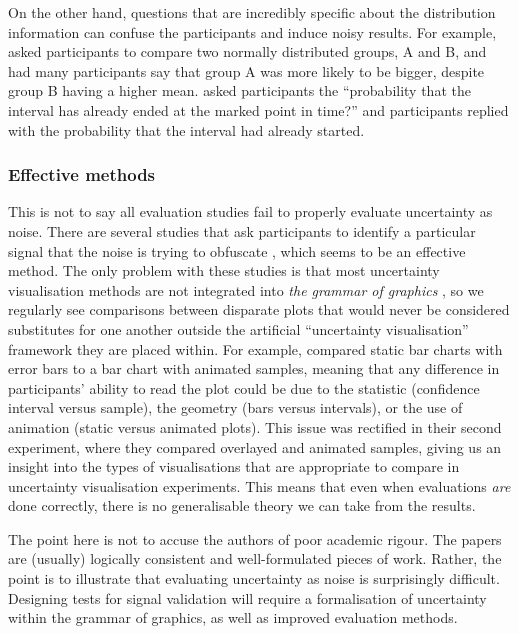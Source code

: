 \documentclass[]{ar-1col-S2O}
\begin{document}
On the other hand, questions that are incredibly specific about the
distribution information can confuse the participants and induce noisy
results. For example, \citet{Hullman2015} asked participants to compare
two normally distributed groups, A and B, and had many participants say
that group A was more likely to be bigger, despite group B having a
higher mean. \citet{Gschwandtnei2016} asked participants the
``probability that the interval has already ended at the marked point in
time?'' and participants replied with the probability that the interval
had already started.

\subsubsection{Effective methods}\label{effective-methods}

This is not to say all evaluation studies fail to properly evaluate
uncertainty as noise. There are several studies that ask participants to
identify a particular signal that the noise is trying to obfuscate
\citep{Kale2018, Correll2014}, which seems to be an effective method.
The only problem with these studies is that most uncertainty
visualisation methods are not integrated into \emph{the grammar of
graphics} \citep{Leland2005, ggplot2}, so we regularly see comparisons
between disparate plots that would never be considered substitutes for
one another outside the artificial ``uncertainty visualisation''
framework they are placed within. For example, \citet{Kale2018} compared
static bar charts with error bars to a bar chart with animated samples,
meaning that any difference in participants' ability to read the plot
could be due to the statistic (confidence interval versus sample), the
geometry (bars versus intervals), or the use of animation (static versus
animated plots). This issue was rectified in their second experiment,
where they compared overlayed and animated samples, giving us an insight
into the types of visualisations that are appropriate to compare in
uncertainty visualisation experiments. This means that even when
evaluations \emph{are} done correctly, there is no generalisable theory
we can take from the results.

The point here is not to accuse the authors of poor academic rigour. The
papers are (usually) logically consistent and well-formulated pieces of
work. Rather, the point is to illustrate that evaluating uncertainty as
noise is surprisingly difficult. Designing tests for signal validation
will require a formalisation of uncertainty within the grammar of
graphics, as well as improved evaluation methods.
\end{document}
